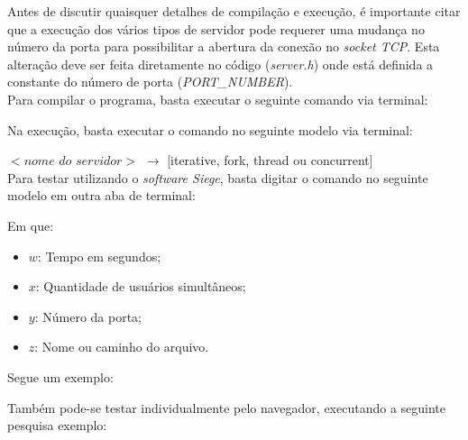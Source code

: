 \documentclass[a4paper, 12pt]{article}
\begin{document}
Antes de discutir quaisquer detalhes de compilação e execução, é importante citar que a execução dos vários tipos de servidor pode requerer uma mudança no número da porta para possibilitar a abertura da conexão no \emph{socket TCP}. Esta alteração deve ser feita diretamente no código (\emph{server.h}) onde está definida a constante do número de porta (\emph{PORT\_NUMBER}).\\

\noindent Para compilar o programa, basta executar o seguinte comando via terminal:

\begin{center}
\end{center}

\noindent Na execução, basta executar o comando no seguinte modelo via terminal:

\begin{center}
\end{center}

\noindent $<\textit{nome do servidor}>$ \(\rightarrow\) [iterative, fork, thread ou concurrent]\\

\noindent Para testar utilizando o \emph{software Siege}, basta digitar o comando no seguinte modelo em outra aba de terminal:

\begin{center}
\end{center}

\pagebreak

\noindent Em que:
\begin{itemize}
    \item \(w\): Tempo em segundos;
    \item \(x\): Quantidade de usuários simultâneos;
    \item \(y\): Número da porta;
    \item \(z\): Nome ou caminho do arquivo.
\end{itemize}

\noindent Segue um exemplo: 

\begin{center}
\end{center}

\noindent Também pode-se testar individualmente pelo navegador, executando a seguinte pesquisa exemplo: 
\end{document}

